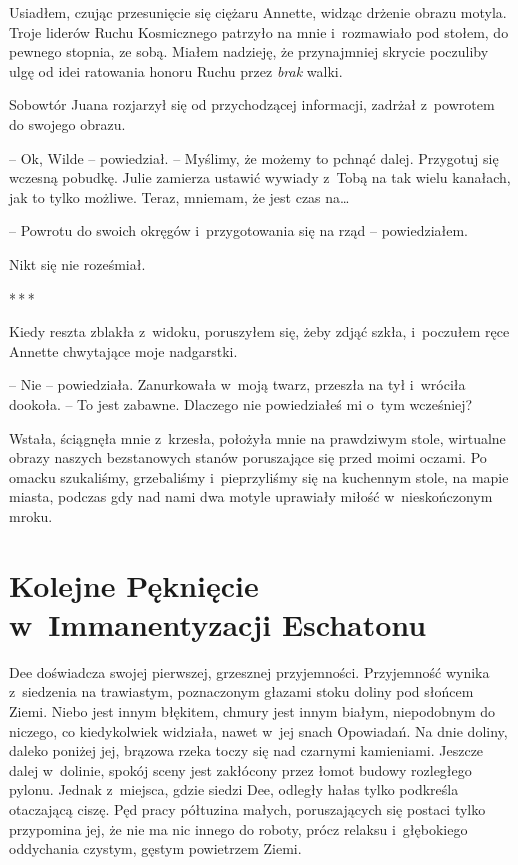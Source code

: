 \documentclass[oneside,polish,11pt,sfheadings]{mwbk}
\newcommand{\threeast}{\bigskip\par\centerline{*\,*\,*}\medskip\par}
\begin{document}
Usiadłem, czując przesunięcie się ciężaru Annette, widząc drżenie obrazu
motyla. Troje liderów Ruchu Kosmicznego patrzyło na mnie i~rozmawiało
pod stołem, do pewnego stopnia, ze sobą. Miałem nadzieję, że
przynajmniej skrycie poczuliby ulgę od idei ratowania honoru Ruchu przez
\emph{brak} walki.

Sobowtór Juana rozjarzył się od przychodzącej informacji, zadrżał z~powrotem do swojego obrazu.

-- Ok, Wilde -- powiedział. -- Myślimy, że możemy to pchnąć dalej.
Przygotuj się wczesną pobudkę. Julie zamierza ustawić wywiady z~Tobą na
tak wielu kanałach, jak to tylko możliwe. Teraz, mniemam, że jest czas
na\ldots

-- Powrotu do swoich okręgów i~przygotowania się na rząd -- powiedziałem.

Nikt się nie roześmiał.
\threeast
Kiedy reszta zblakła z~widoku, poruszyłem się, żeby zdjąć szkła, i~poczułem ręce Annette chwytające moje nadgarstki.

-- Nie -- powiedziała. Zanurkowała w~moją twarz, przeszła na tył i~wróciła
dookoła. -- To jest zabawne. Dlaczego nie powiedziałeś mi o~tym
wcześniej?

Wstała, ściągnęła mnie z~krzesła, położyła mnie na prawdziwym stole,
wirtualne obrazy naszych bezstanowych stanów poruszające się przed moimi
oczami. Po omacku szukaliśmy, grzebaliśmy i~pieprzyliśmy się na
kuchennym stole, na mapie miasta, podczas gdy nad nami dwa motyle
uprawiały miłość w~nieskończonym mroku.

\chapter{Kolejne Pęknięcie w~Immanentyzacji Eschatonu }

Dee doświadcza swojej pierwszej, grzesznej przyjemności. Przyjemność
wynika z~siedzenia na trawiastym, poznaczonym głazami stoku doliny pod
słońcem Ziemi. Niebo jest innym błękitem, chmury jest innym białym,
niepodobnym do niczego, co kiedykolwiek widziała, nawet w~jej snach
Opowiadań. Na dnie doliny, daleko poniżej jej, brązowa rzeka toczy się
nad czarnymi kamieniami. Jeszcze dalej w~dolinie, spokój sceny jest
zakłócony przez łomot budowy rozległego pylonu. Jednak z~miejsca, gdzie
siedzi Dee, odległy hałas tylko podkreśla otaczającą ciszę. Pęd pracy
półtuzina małych, poruszających się postaci tylko przypomina jej, że nie
ma nic innego do roboty, prócz relaksu i~głębokiego oddychania czystym,
gęstym powietrzem Ziemi.
\end{document}
